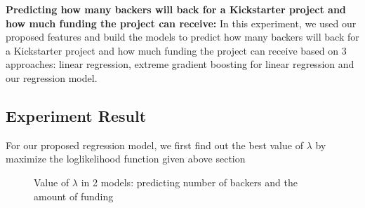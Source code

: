 \textbf{Predicting how many backers will back for a Kickstarter project and how much funding the project can receive:} In this experiment, we used our proposed features and build the models to predict how many backers will back for a Kickstarter project and how much funding the project can receive based on 3 approaches: linear regression, extreme gradient boosting for linear regression and our regression model. 
\subsection{Experiment Result}
For our proposed regression model, we first find out the best value of $\lambda$ by maximize the loglikelihood function given above section

\begin{figure}%
	\centering
	\hspace{1cm}
	\caption{Value of $\lambda$ in 2 models: predicting number of backers and the amount of funding}
	\label{fig:LambdaFig}
	\vspace{-10pt}
\end{figure}
